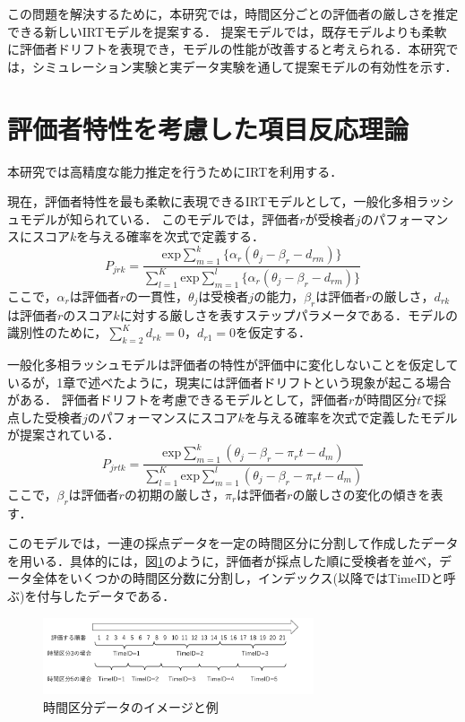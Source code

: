 \documentclass[twocolumn,10pt]{jsarticle}
\begin{document}
この問題を解決するために，本研究では，時間区分ごとの評価者の厳しさを推定できる新しいIRTモデルを提案する．
提案モデルでは，既存モデルよりも柔軟に評価者ドリフトを表現でき，モデルの性能が改善すると考えられる．本研究では，シミュレーション実験と実データ実験を通して提案モデルの有効性を示す．

\vspace{-2mm}
\section{評価者特性を考慮した項目反応理論}\label{sec:features}
\vspace{-1mm}
本研究では高精度な能力推定を行うためにIRTを利用する．

現在，評価者特性を最も柔軟に表現できるIRTモデルとして，一般化多相ラッシュモデルが知られている\cite{g-MFRM}．
このモデルでは，評価者$r$が受検者$j$のパフォーマンスにスコア$k$を与える確率を次式で定義する．
\begin{equation}
  P_{jrk}=\frac{\mathrm{exp}\sum_{m=1}^{k}\{\alpha_r(\theta_{j}-\beta_{r}-d_{rm})\}}{\sum_{l=1}^{K}\mathrm{exp}\sum_{m=1}^{l}\{\alpha_r(\theta_{j}-\beta_{r}-d_{rm})\}}
\end{equation}
ここで，$\alpha_r$は評価者$r$の一貫性，$\theta_j$は受検者$j$の能力，$\beta_r$は評価者$r$の厳しさ，$d_{rk}$は評価者$r$のスコア$k$に対する厳しさを表すステップパラメータである．モデルの識別性のために，$\sum^{K}_{k=2}{d_{rk}}=0$，$d_{r1}=0$を仮定する．

一般化多相ラッシュモデルは評価者の特性が評価中に変化しないことを仮定しているが，1章で述べたように，現実には評価者ドリフトという現象が起こる場合がある．
評価者ドリフトを考慮できるモデルとして，評価者$r$が時間区分$t$で採点した受検者$j$のパフォーマンスにスコア$k$を与える確率を次式で定義したモデルが提案されている．
\begin{equation}
  P_{jrtk}=\frac{\mathrm{exp}\sum_{m=1}^{k}(\theta_{j}-\beta_{r} - \pi_{r}t-d_{m})}{\sum_{l=1}^{K}\mathrm{exp}\sum_{m=1}^{l}(\theta_{j}-\beta_{r} - \pi_{r}t-d_{m})}
\end{equation}
ここで，$\beta_{r}$は評価者$r$の初期の厳しさ，$\pi_{r}$は評価者$r$の厳しさの変化の傾きを表す．

このモデルでは，一連の採点データを一定の時間区分に分割して作成したデータを用いる．具体的には，図\ref{timeid}のように，評価者が採点した順に受検者を並べ，データ全体をいくつかの時間区分数に分割し，インデックス(以降ではTimeIDと呼ぶ)を付与したデータである．

\begin{figure}[t]
  \centering
  \includegraphics[width=8cm]{img/timeid.png}
  \caption{時間区分データのイメージと例}
  \label{timeid}
\end{figure}
\end{document}

